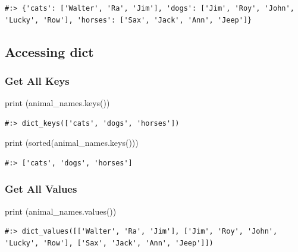 \documentclass[
]{book}
\newenvironment{Shaded}{\begin{snugshade}}{\end{snugshade}}
\newcommand{\BuiltInTok}[1]{#1}
\newcommand{\NormalTok}[1]{#1}
\begin{document}
\begin{verbatim}
#:> {'cats': ['Walter', 'Ra', 'Jim'], 'dogs': ['Jim', 'Roy', 'John', 'Lucky', 'Row'], 'horses': ['Sax', 'Jack', 'Ann', 'Jeep']}
\end{verbatim}

\hypertarget{accessing-dict}{%
\subsection{Accessing dict}\label{accessing-dict}}

\hypertarget{get-all-keys}{%
\subsubsection{Get All Keys}\label{get-all-keys}}

\begin{Shaded}
\begin{Highlighting}[]
\BuiltInTok{print}\NormalTok{ (animal_names.keys())}
\end{Highlighting}
\end{Shaded}

\begin{verbatim}
#:> dict_keys(['cats', 'dogs', 'horses'])
\end{verbatim}

\begin{Shaded}
\begin{Highlighting}[]
\BuiltInTok{print}\NormalTok{ (}\BuiltInTok{sorted}\NormalTok{(animal_names.keys()))}
\end{Highlighting}
\end{Shaded}

\begin{verbatim}
#:> ['cats', 'dogs', 'horses']
\end{verbatim}

\hypertarget{get-all-values}{%
\subsubsection{Get All Values}\label{get-all-values}}

\begin{Shaded}
\begin{Highlighting}[]
\BuiltInTok{print}\NormalTok{ (animal_names.values())}
\end{Highlighting}
\end{Shaded}

\begin{verbatim}
#:> dict_values([['Walter', 'Ra', 'Jim'], ['Jim', 'Roy', 'John', 'Lucky', 'Row'], ['Sax', 'Jack', 'Ann', 'Jeep']])
\end{verbatim}
\end{document}
